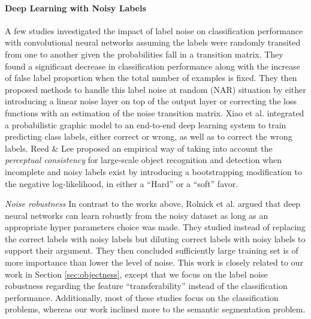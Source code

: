 \paragraph{{Deep Learning with Noisy Labels}}
A few studies\cite{sukhbaatar2014training,patrini2016making} investigated the impact of label noise on classification performance with convolutional neural networks assuming the labels were randomly transited from one to another given the probabilities fall in a transition matrix.
They found a significant decrease in classification performance along with the increase of false label proportion when the total number of examples is fixed.
They then proposed methods to handle this label noise at random (NAR)\cite{frenay2014classification} situation by either introducing a linear noise layer on top of the output layer\cite{sukhbaatar2014training} or correcting the loss functions with an estimation of the noise transition matrix\cite{patrini2016making}.
Xiao et al.\cite{xiao2015learning} integrated a probabilistic graphic model to an end-to-end deep learning system to train predicting class labels, either correct or wrong, as well as to correct the wrong labels.
Reed \& Lee\cite{reed2014training} proposed an empirical way of taking into account the \textit{perceptual consistency} for large-scale object recognition and detection when incomplete and noisy labels exist by introducing a bootstrapping modification to the negative log-likelihood, in either a ``Hard'' or a ``soft'' favor.

\textit{Noise robustness}
In contrast to the works above, Rolnick et al.\cite{rolnick2017deep} argued that deep neural networks can learn robustly from the noisy dataset as long as an appropriate hyper parameters choice was made.
They studied instead of replacing the correct labels with noisy labels but diluting correct labels with noisy labels to support their argument.
They then concluded sufficiently large training set is of more importance than lower the level of noise.
This work is closely related to our work in Section \ref{sec:objectness}, except that we focus on the label noise robustness regarding the feature ``transferability'' instead of the classification performance.
Additionally, most of these studies focus on the classification problems, whereas our work inclined more to the semantic segmentation problem.

